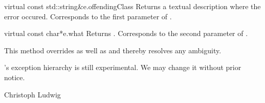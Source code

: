 \begin{cfcode}{virtual const std::string&}{e.offendingClass}{}
  Returns a textual description where the error occured. Corresponds to the
  first parameter of .
\end{cfcode}

\begin{cfcode}{virtual const char*}{e.what}{}
  Returns . Corresponds to the second
  parameter of .

  This method overrides  as well as
   and thereby resolves any ambiguity.
\end{cfcode}



\SEEALSO
{}



\WARNINGS

\LiDIA's exception hierarchy is still experimental. We may change it without
prior notice.


\AUTHOR

Christoph Ludwig



